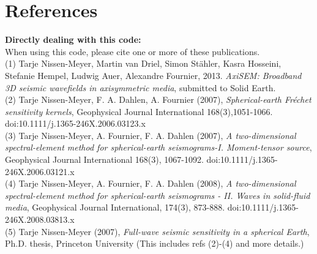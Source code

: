 \documentclass{article}
\begin{document}
\newpage
\section{References}

\noindent \textbf{Directly dealing with this code:}\vspace*{0.2cm}\\
When using this code, please cite one or more of these publications. \vspace*{0.2cm}\\


(1) Tarje Nissen-Meyer, Martin van Driel, Simon St\"ahler, Kasra Hosseini,
Stefanie Hempel, Ludwig Auer, Alexandre Fournier, 2013. \textit{AxiSEM: Broadband 3D
seismic wavefields in axisymmetric media}, submitted to Solid Earth.\\

(2) Tarje Nissen-Meyer, F. A. Dahlen, A. Fournier (2007),
\textit{Spherical-earth Fr\'{e}chet sensitivity kernels},        
Geophysical Journal International 168(3),1051-1066. 
doi:10.1111/j.1365-246X.2006.03123.x                \\
                                                        
(3) Tarje Nissen-Meyer, A. Fournier, F. A. Dahlen (2007), 
\textit{A two-dimensional spectral-element method for
spherical-earth seismograms-I. Moment-tensor source}, 
Geophysical Journal International 168(3), 1067-1092. 
doi:10.1111/j.1365-246X.2006.03121.x                 \\
                                                       
(4) Tarje Nissen-Meyer, A. Fournier, F. A. Dahlen (2008),  
\textit{A two-dimensional spectral-element method for   
spherical-earth seismograms - II. Waves in solid-fluid media},
Geophysical Journal International, 174(3), 873-888.
doi:10.1111/j.1365-246X.2008.03813.x\\

(5) Tarje Nissen-Meyer (2007),
\textit{Full-wave seismic sensitivity in a spherical Earth},
Ph.D. thesis, Princeton University
(This includes refs (2)-(4) and more details.)\\
% 

\end{document}
